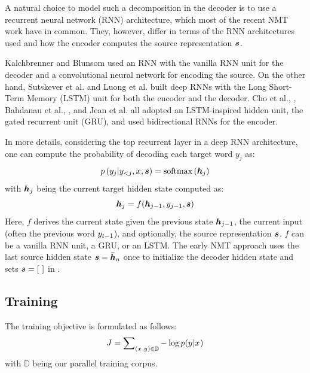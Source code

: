 A natural choice to model such a decomposition in the decoder is to use a
recurrent neural network (RNN) architecture, which most of the recent NMT work have in common. They,
however, differ in terms of the RNN architectures used and how the encoder computes the source representation $\mbox{\boldmath{$s$}}$.

Kalchbrenner and Blunsom \cite{kal13} used an RNN with the vanilla RNN unit for the decoder and a
convolutional neural network for encoding the source. On
the other hand, Sutskever et al. \cite{sutskever14} and Luong et al.
\cite{luong15,luong15attn} built deep RNNs with the Long Short-Term Memory (LSTM) unit
\cite{lstm97} for both the encoder and the decoder. Cho et al., \cite{cho14}, Bahdanau et al.,
\cite{bog15}, and Jean et al. \cite{jean15,mono15} all adopted an
LSTM-inspired hidden unit, the gated recurrent unit (GRU), and used bidirectional
RNNs for the encoder.

In more details, considering the top recurrent layer in a deep RNN architecture, one can compute the probability of decoding each target word $y_j$ as:
\begin{equation}
p\left(y_{j}|y_{<j},x_{},\mbox{\boldmath{$s$}}\right) = \operatorname{softmax}\left(\mbox{\boldmath{$h$}}_{j}\right)
\end{equation}
with $\mbox{\boldmath{$h$}}_{j}$ being the current target hidden state computed as:
\begin{equation}
\label{e:rnn}
\mbox{\boldmath{$h$}}_{j} = f(\mbox{\boldmath{$h$}}_{j-1}, y_{j-1}, \mbox{\boldmath{$s$}})
\end{equation}
Here, $f$ derives the current state given the previous state
$\mbox{\boldmath{$h$}}_{j-1}$, the
current input (often the previous word $y_{t-1}$), and optionally, the source
representation $\mbox{\boldmath{$s$}}$.
$f$ can be a vanilla RNN unit, a GRU, or an LSTM. 
The early NMT approach  \cite{kal13,sutskever14,cho14,luong15} uses the last source hidden state
$\mbox{\boldmath{$s$}}=\mbox{\boldmath{$\bar{h}$}}_{n}$ once to initialize the decoder hidden state and sets $\mbox{\boldmath{$s$}}=[\text{ }]$ in
.

\subsection{Training}
The training objective is formulated as follows:
\begin{equation}
J = \sum_{(x_{},y_{}) \in \mathbb{D}} \nolimits -\log p(y_{}|x_{})
\label{e:j_t}
\end{equation}
with $\mathbb{D}$ being our parallel training corpus.


